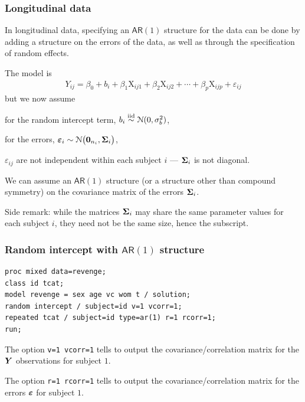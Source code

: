 \documentclass{beamer}
\begin{document}
 \begin{frame}
\frametitle{Longitudinal data}
\bi
\item In longitudinal data, specifying an $\mathsf{AR}(1)$ structure for the data can be done by adding a structure on the errors of the data, \alert{as well as through the specification of random effects}.
\item The model is
\begin{align*}
Y_{ij}=\beta_0 +b_i + \beta_1 \mathrm{X}_{ij1}+\beta_2\mathrm{X}_{ij2}+\cdots+\beta_p\mathrm{X}_{ijp} + \varepsilon_{ij}
\end{align*}
but we now assume 
\bi

\item for the random intercept term, $b_{i} \stackrel{\textnormal{iid}}{\sim} \mathcal{N}(0, \sigma^2_b)$,
\item  for the errors, $\boldsymbol {\varepsilon}_i \sim \mathcal{N}\big(\boldsymbol {0}_{n_i}, \boldsymbol {\Sigma}_i\big)$,
\item $\varepsilon_{ij}$ are \alert{not independent} within each subject $i$ --- $\boldsymbol {\Sigma}_i$ is not diagonal.
\ei
\item We can assume an $\mathsf{AR}(1)$ structure (or a structure other than compound symmetry) on the covariance matrix of the errors $\boldsymbol {\Sigma}_i$.
\ei

{\footnotesize Side remark:
 while the matrices $\boldsymbol {\Sigma}_i$ may share the same parameter values for each subject $i$, they need not be the same size, hence the subscript.
 
 }
\end{frame}
 
\begin{frame}[fragile]
\frametitle{Random intercept with $\mathsf{AR}(1)$ structure}
\begin{tcolorbox}[colback=white, colframe=hecblue, title=\SASlang{} code for the random intercept model with $\mathsf{AR}(1)$ errors]
\begin{verbatim}
proc mixed data=revenge; 
class id tcat; 
model revenge = sex age vc wom t / solution;
random intercept / subject=id v=1 vcorr=1; 
repeated tcat / subject=id type=ar(1) r=1 rcorr=1;
run;
\end{verbatim}
\end{tcolorbox}

\bi
\item The option \texttt{v=1 vcorr=1} tells \SASlang{} to output the covariance/correlation matrix for the \alert{$\boldsymbol {Y}$ observations} for subject $1$.
\item The option \texttt{r=1 rcorr=1}  tells \SASlang{} to output the covariance/correlation matrix for the \alert{errors $\boldsymbol {\varepsilon}$} for subject $1$.
\ei
\end{frame}
\end{document}
